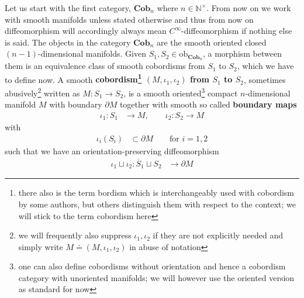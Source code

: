 \nocite{0a816f4c}
Let us start with the first category, $\mathbf{Cob}_{n}$ where $n \in \mathbb{N}^{\times}$. From now on we work with smooth manifolds unless stated otherwise and thus from now on diffeomorphism will accordingly always mean $C^{\infty}$-diffeomorphism if nothing else is said. The objects in the category $\mathbf{Cob}_{n}$ are the smooth oriented closed $(n - 1)$-dimensional manifolds. Given $S_{1},S_{2} \in \mathrm{ob}_{\mathbf{Cob}_{n}}$, a morphism between them is an equivalence class of smooth cobordisms from $S_{1}$ to $S_{2}$, which we have to define now. A smooth \textbf{cobordism\footnote{there also is the term bordism which is interchangeably used with cobordism by some authors, but others distinguish them with respect to the context; we will stick to the term cobordism here} $(M,\iota_{1},\iota_{2})$ from $S_{1}$ to $S_{2}$}, sometimes abusively\footnote{we will frequently also suppress $\iota_{1},\iota_{2}$ if they are not explicitly needed and simply write $M \doteq (M,\iota_{1},\iota_{2})$ in abuse of notation} written as $M \colon S_{1} \to S_{2}$, is a smooth oriented\footnote{one can also define cobordisms without orientation and hence a cobordism category with unoriented manifolds; we will however use the oriented version as standard for now} compact $n$-dimensional manifold $M$ with boundary $\partial M$ together with smooth so called \textbf{boundary maps}
\begin{align*}
  \iota_{1}
  \colon
  S_{1}
  &\to
  M
  ,\qquad
  \iota_{2}
  \colon
  S_{2}
  \to
  M
\end{align*}
with
\begin{align*}
  \iota_{i}(S_{i})
  &\subset
  \partial M
  \qquad
  \text{for }
  i
  =
  1,2
\end{align*}
such that we have an orientation-preserving diffeomorphism
\begin{align*}
  \iota_{1}
  \sqcup
  \iota_{2}
  \colon
  \overline{S}_{1}
  \sqcup
  S_{2}
  &\to
  \partial M
\end{align*}
